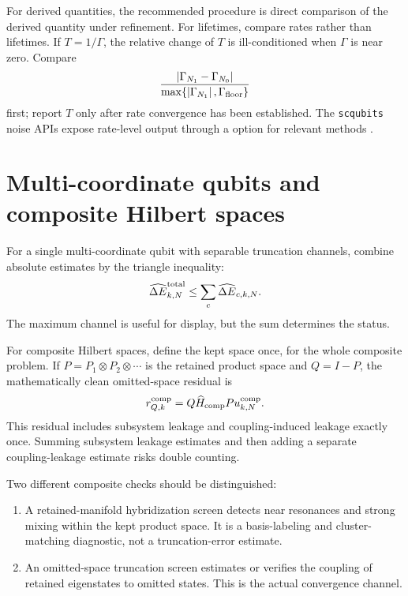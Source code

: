 \documentclass[11pt,a4paper]{article}
\newcommand{\abs}[1]{\left|#1\right|}
\newcommand{\Hhat}{\widehat H}
\newcommand{\errhat}{\widehat{\Delta E}}
\newcommand{\code}[1]{\texttt{\detokenize{#1}}}
\begin{document}
For derived quantities, the recommended procedure is direct comparison of the derived quantity under refinement.  For lifetimes, compare rates rather than lifetimes.  If $T=1/\Gamma$, the relative change of $T$ is ill-conditioned when $\Gamma$ is near zero.  Compare
\begin{equation}
  \frac{\abs{\Gamma_{N_1}-\Gamma_{N_0}}}{\max\{\abs{\Gamma_{N_1}},\Gamma_{\rm floor}\}}
\end{equation}
first; report $T$ only after rate convergence has been established.  The \texttt{scqubits} noise APIs expose rate-level output through a \code{get_rate} option for relevant methods \cite{scqubits_fluxonium_api}.

\section{Multi-coordinate qubits and composite Hilbert spaces}
\label{sec:composite}

For a single multi-coordinate qubit with separable truncation channels, combine absolute estimates by the triangle inequality:
\begin{equation}
  \errhat_{k,N}^{\rm total}\le \sum_c \errhat_{c,k,N}.
\end{equation}
The maximum channel is useful for display, but the sum determines the status.

For composite Hilbert spaces, define the kept space once, for the whole composite problem.  If $P=P_1\otimes P_2\otimes\cdots$ is the retained product space and $Q=I-P$, the mathematically clean omitted-space residual is
\begin{equation}
  r_{Q,k}^{\rm comp}=Q\Hhat_{\rm comp}P u_{k,N}^{\rm comp}.
\end{equation}
This residual includes subsystem leakage and coupling-induced leakage exactly once.  Summing subsystem leakage estimates and then adding a separate coupling-leakage estimate risks double counting.

Two different composite checks should be distinguished:
\begin{enumerate}
\item A retained-manifold hybridization screen detects near resonances and strong mixing within the kept product space.  It is a basis-labeling and cluster-matching diagnostic, not a truncation-error estimate.
\item An omitted-space truncation screen estimates or verifies the coupling of retained eigenstates to omitted states.  This is the actual convergence channel.
\end{enumerate}
\end{document}
